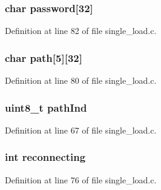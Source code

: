 \subsubsection[{\texorpdfstring{password}{password}}]{\setlength{\rightskip}{0pt plus 5cm}char password\mbox{[}32\mbox{]}}\hypertarget{structstate_slot__t_a2bfda7e5c73ce534de13604eb4a02565}{}\label{structstate_slot__t_a2bfda7e5c73ce534de13604eb4a02565}


Definition at line 82 of file single\+\_\+load.\+c.

\subsubsection[{\texorpdfstring{path}{path}}]{\setlength{\rightskip}{0pt plus 5cm}char path\mbox{[}5\mbox{]}\mbox{[}32\mbox{]}}\hypertarget{structstate_slot__t_aae270593a607896248d352ee9d7caa2b}{}\label{structstate_slot__t_aae270593a607896248d352ee9d7caa2b}


Definition at line 80 of file single\+\_\+load.\+c.

\subsubsection[{\texorpdfstring{path\+Ind}{pathInd}}]{\setlength{\rightskip}{0pt plus 5cm}uint8\+\_\+t path\+Ind}\hypertarget{structstate_slot__t_a545d93951b682c93f99d3cefc1026780}{}\label{structstate_slot__t_a545d93951b682c93f99d3cefc1026780}


Definition at line 67 of file single\+\_\+load.\+c.

\subsubsection[{\texorpdfstring{reconnecting}{reconnecting}}]{\setlength{\rightskip}{0pt plus 5cm}int reconnecting}\hypertarget{structstate_slot__t_a6c8d3290d532f7d318073701051f8c39}{}\label{structstate_slot__t_a6c8d3290d532f7d318073701051f8c39}


Definition at line 76 of file single\+\_\+load.\+c.

